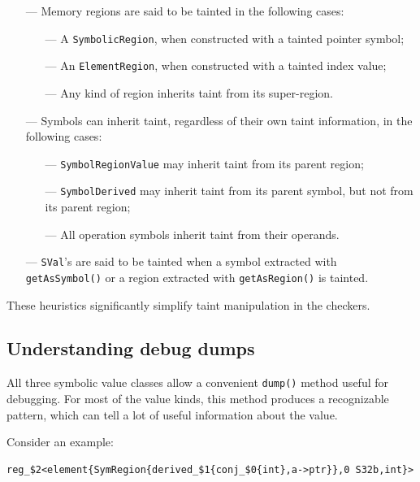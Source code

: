 \documentclass[a4paper,12pt]{article}
\newenvironment{nobr}{\begin{minipage}{\textwidth}\setlength\parskip{1em}
}{\end{minipage}\ignorespacesafterend}
\begin{document}
\begin{itemize}
\item[---]Memory regions are said to be tainted in the following cases:
\medskip
\begin{itemize}
\item[---]A \lstinline|SymbolicRegion|, when constructed with a tainted pointer symbol;
\item[---]An \lstinline|ElementRegion|, when constructed with a tainted index value;
\item[---]Any kind of region inherits taint from its super-region.
\end{itemize}
\item[---]Symbols can inherit taint, regardless of their own taint information, in the following cases:
\medskip
\begin{itemize}
\item[---]\lstinline|SymbolRegionValue| may inherit taint from its parent region;
\item[---]\lstinline|SymbolDerived| may inherit taint from its parent symbol, but not from its parent region;
\item[---]All operation symbols inherit taint from their operands.
\end{itemize}
\item[---]\lstinline|SVal|'s are said to be tainted when a symbol extracted with \lstinline|getAsSymbol()| or a region extracted with \lstinline|getAsRegion()| is tainted.
\end{itemize}

These heuristics significantly simplify taint manipulation in the checkers.

\begin{nobr}
\subsection{Understanding debug dumps}

All three symbolic value classes allow a convenient \lstinline|dump()| method useful for debugging. For most of the value kinds, this method produces a recognizable pattern, which can tell a lot of useful information about the value.
\end{nobr}

\begin{nobr}
Consider an example:
\begin{lstlisting}[style=commandline]
reg_$2<element{SymRegion{derived_$1{conj_$0{int},a->ptr}},0 S32b,int}>
\end{lstlisting}
\end{nobr}
\end{document}
